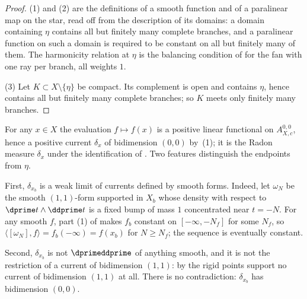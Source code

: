 \begin{proof}
(1) and (2) are the definitions of a smooth function and of a paralinear map
on the star, read off from the description of its domains: a domain
containing $\eta$ contains all but finitely many complete branches, and a
paralinear function on such a domain is required to be constant on all but
finitely many of them.  The harmonicity relation at $\eta$ is the balancing
condition of  for the fan with one ray per
branch, all weights $1$.

(3) Let $K\subset X\setminus\{\eta\}$ be compact.  Its complement is open and
contains $\eta$, hence contains all but finitely many complete branches; so
$K$ meets only finitely many branches.
\end{proof}

\begin{example}
\label{ex:ch14-line-diracs}
For any $x\in X$ the evaluation $f\mapsto f(x)$ is a positive linear
functional on $A_{X,c}^{0,0}$, hence a positive current $\delta_x$ of
bidimension $(0,0)$ by
\,(1); it is the Radon measure
$\delta_x$ under the identification of
.  Two features distinguish the endpoints
from $\eta$.

First, $\delta_{x_b}$ is a weak limit of currents defined by smooth forms.
Indeed, let $\omega_N$ be the smooth $(1,1)$-form supported in $X_b$ whose
density with respect to $\dprime t\wedge\ddprime t$ is a fixed bump of mass
$1$ concentrated near $t=-N$.  For any smooth $f$, part (1) of
 makes $f_b$ constant on
$[-\infty,-N_f]$ for some $N_f$, so
$\langle[\omega_N],f\rangle=f_b(-\infty)=f(x_b)$ for $N\ge N_f$; the sequence
is eventually constant.

Second, $\delta_{x_b}$ is not $\dprimeddprime$ of anything smooth, and it is
not the restriction of a current of bidimension $(1,1)$: by
 the rigid points support no current of
bidimension $(1,1)$ at all.  There is no contradiction: $\delta_{x_b}$ has
bidimension $(0,0)$.
\end{example}

